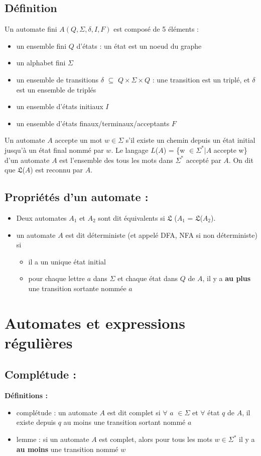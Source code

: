 \documentclass{article}
\begin{document}
\subsection{Définition}
Un automate fini $A(Q,\Sigma,\delta,I,F)$ est composé de 5 éléments :
\begin{itemize}
    \item un ensemble fini $Q$ d'états : un état est un noeud du graphe
    \item un alphabet fini $\Sigma$
    \item un ensemble de transitions $\delta$ $\subseteq$ $Q \times \Sigma \times Q$ : une transition est un triplé, et $\delta$ est un ensemble de triplés
    \item un ensemble d'états initiaux $I$
    \item un ensemble d'états finaux/terminaux/acceptants $F$
\end{itemize}
Un automate $A$ accepte un mot $w \in \Sigma$ s'il existe un chemin depuis un état initial jusqu'à un état final nommé par $w$.\newline
Le langage $L$($A$) = \{w $\in \Sigma^{*} | A$ accepte w\} d'un automate $A$ est l'ensemble des tous les mots dans $\Sigma^{*}$ accepté par $A$. On dit que $\mathfrak{L}$($A$) est reconnu par $A$.\newline

\subsection{Propriétés d'un automate :}
\begin{itemize}
    \item Deux automates $A_{1}$ et $A_{2}$ sont dit équivalents si $\mathfrak{L}$ ($A_{1}$ = $\mathfrak{L}$($A_{2}$).
    \item un automate $A$ est dit déterministe (et appelé DFA, NFA si non déterministe) si
    \begin{itemize}
        \item il a un unique état initial
        \item pour chaque lettre $a$ dans $\Sigma$ et chaque état dans $Q$ de $A$, il y a \textbf{au plus} une transition sortante nommée $a$
    \end{itemize}
\end{itemize}
\newpage
\section{Automates et expressions régulières}
\subsection{Complétude :}
\textbf{Définitions :}
\begin{itemize}
    \item complétude : un automate $A$ est dit complet si $\forall$ $a$ $\in \Sigma$ et $\forall$ état $q$ de $A$, il existe depuis $q$ au moins une transition sortant nommé $a$
    \item lemme : si un automate $A$ est complet, alors pour tous les mots $w \in \Sigma^{*}$ il y a \textbf{au moins} une transition nommé $w$
\end{itemize}
\end{document}
